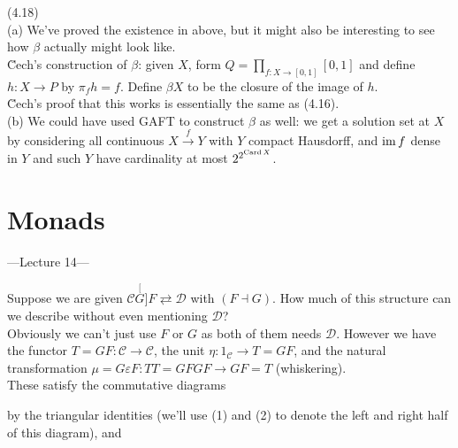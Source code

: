 \documentclass[a4paper]{article}
\begin{document}
\begin{rem} (4.18)\\
    (a) We've proved the existence in above, but it might also be interesting to see how $\beta$ actually might look like.\\
    \u{C}ech's construction of $\beta$: given $X$, form $Q = \prod_{f:X \to [0,1]} [0,1]$ and define $h:X \to P$ by $\pi_f h = f$. Define $\beta X$ to be the closure of the image of $h$.\\
    \u{C}ech's proof that this works is essentially the same as (4.16).\\
    (b) We could have used GAFT to construct $\beta$ as well: we get a solution set at $X$ by considering all continuous $X \xrightarrow{f} Y$ with $Y$ compact Hausdorff, and $\operatorname{im} f$ dense in $Y$ and such $Y$ have cardinality at most $2^{2^{\operatorname{Card} X}}$.
\end{rem}

\newpage

\section{Monads}

---Lecture 14---

Suppose we are given $\mathcal{C} \stackrel[G]{F}{\rightleftarrows} \mathcal{D}$ with $(F \dashv G)$. How much of this structure can we describe without even mentioning $\mathcal{D}$?\\
Obviously we can't just use $F$ or $G$ as both of them needs $\mathcal{D}$. However we have the functor $T=GF:\mathcal{C} \to \mathcal{C}$, the unit $\eta: 1_{\mathcal{C}} \to T = GF$, and the natural transformation $\mu=G\varepsilon F: TT=GFGF \to GF = T$ (whiskering).\\
These satisfy the commutative diagrams


by the triangular identities (we'll use (1) and (2) to denote the left and right half of this diagram), and 

\end{document}
